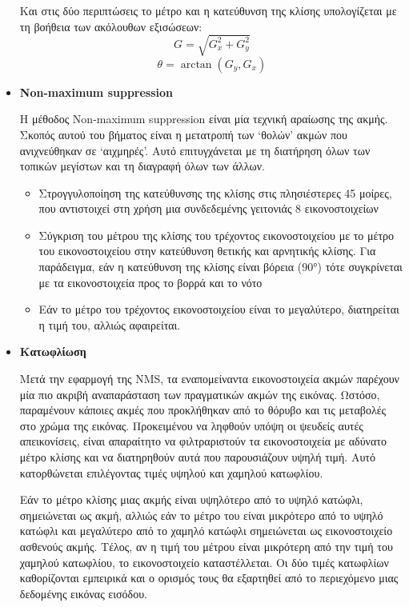 \begin{itemize}[label={},leftmargin=*]
\hfill \break
Και στις δύο περιπτώσεις το μέτρο και η κατεύθυνση της κλίσης υπολογίζεται με τη βοήθεια των ακόλουθων εξισώσεων:
\begin{equation}
G = \sqrt{G_x^2 + G_y^2}
\end{equation}
\begin{equation}
 \theta = \arctan{(G_y,G_x)}
\end{equation}
\item \textbf{Non-maximum suppression}


Η μέθοδος Non-maximum suppression είναι μία τεχνική αραίωσης της ακμής. Σκοπός αυτού του βήματος είναι η μετατροπή των `θολών' ακμών που ανιχνεύθηκαν σε `αιχμηρές'. Αυτό επιτυγχάνεται με τη διατήρηση όλων των τοπικών μεγίστων και τη διαγραφή όλων των άλλων. \\

\begin{itemize}
	\item Στρογγυλοποίηση της κατεύθυνσης της κλίσης στις πλησιέστερες 45 μοίρες, που αντιστοιχεί στη χρήση μια συνδεδεμένης γειτονιάς 8 εικονοστοιχείων
	\item Σύγκριση του μέτρου της κλίσης του τρέχοντος εικονοστοιχείου με το μέτρο του εικονοστοιχείου στην κατεύθυνση θετικής και αρνητικής κλίσης. Για παράδειγμα, εάν η κατεύθυνση της κλίσης είναι βόρεια ($\ang{90}$) τότε συγκρίνεται με τα εικονοστοιχεία προς το βορρά και το νότο
	\item Εάν το μέτρο του τρέχοντος εικονοστοιχείου είναι το μεγαλύτερο, διατηρείται η τιμή του, αλλιώς αφαιρείται. \\
\end{itemize}
\item \textbf{Κατωφλίωση}

Μετά την εφαρμογή της NMS, τα εναπομείναντα εικονοστοιχεία ακμών παρέχουν μία πιο ακριβή αναπαράσταση των πραγματικών ακμών της εικόνας. Ωστόσο, παραμένουν κάποιες ακμές που προκλήθηκαν από το θόρυβο και τις μεταβολές στο χρώμα της εικόνας. Προκειμένου να ληφθούν υπόψη οι ψευδείς αυτές απεικονίσεις, είναι απαραίτητο να φιλτραριστούν τα εικονοστοιχεία με αδύνατο μέτρο κλίσης και να διατηρηθούν αυτά που παρουσιάζουν υψηλή τιμή. Αυτό κατορθώνεται επιλέγοντας τιμές υψηλού και χαμηλού κατωφλίου.

Εάν το μέτρο κλίσης μιας ακμής είναι υψηλότερο από το υψηλό κατώφλι, σημειώνεται ως ακμή, αλλιώς εάν το μέτρο του είναι μικρότερο από το υψηλό κατώφλι και μεγαλύτερο από το χαμηλό κατώφλι σημειώνεται ως εικονοστοιχείο ασθενούς ακμής. Τέλος, αν η τιμή του μέτρου είναι μικρότερη από την τιμή του χαμηλού κατωφλίου, το εικονοστοιχείο καταστέλλεται. Οι δύο τιμές κατωφλίων καθορίζονται εμπειρικά και ο ορισμός τους θα εξαρτηθεί από το περιεχόμενο μιας δεδομένης εικόνας εισόδου. \\


\end{itemize}
